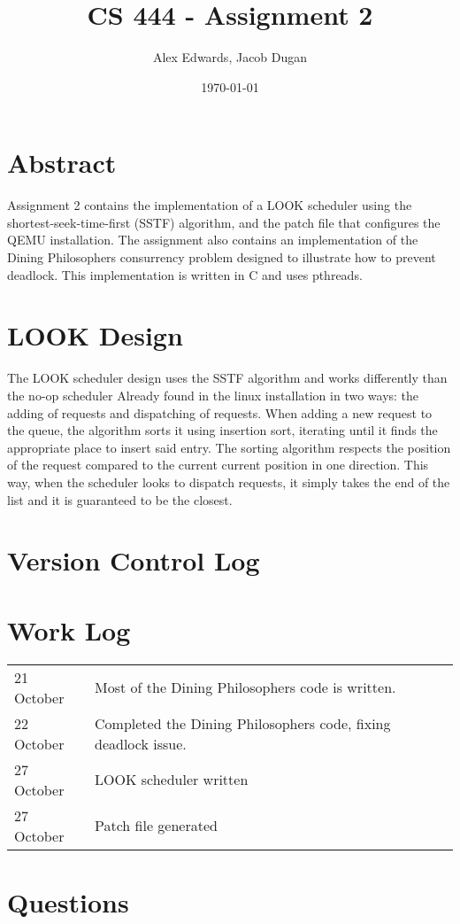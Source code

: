 \documentclass[letterpaper,10pt]{article}
\title{CS 444 - Assignment 2}
\author{Alex Edwards, Jacob Dugan}
\date{\today}
\begin{document}
	\maketitle
	\section*{Abstract}
	Assignment 2 contains the implementation of a LOOK scheduler using the shortest-seek-time-first (SSTF) algorithm, and the patch file that configures the QEMU installation. The assignment also contains an implementation of the Dining Philosophers consurrency problem designed to illustrate how to prevent deadlock. This implementation is written in C and uses pthreads.
	
	\section{LOOK Design}
	The LOOK scheduler design uses the SSTF algorithm and works differently than the no-op scheduler Already found in the linux installation in two ways: the adding of requests and dispatching of requests. When adding a new request to the queue, the algorithm sorts it using insertion sort, iterating until it finds the appropriate place to insert said entry. The sorting algorithm respects the position of the request compared to the current current position in one direction. This way, when the scheduler looks to dispatch requests, it simply takes the end of the list and it is guaranteed to be the closest.
	
	\section{Version Control Log}
	
	\section{Work Log}
	\begin{tabular}{l l}
		21 October & Most of the Dining Philosophers code is written. \\
		22 October & Completed the Dining Philosophers code, fixing deadlock issue.\\
		27 October & LOOK scheduler written \\
		27 October & Patch file generated \\
	\end{tabular}
	
	\section{Questions}
\end{document}
